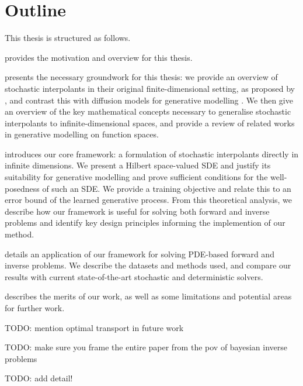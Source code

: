 \section{Outline}
This thesis is structured as follows.

\textbf{} provides the motivation and overview for this thesis.

\textbf{} presents the necessary groundwork for this thesis: we provide an overview of stochastic interpolants in their original finite-dimensional setting, as proposed by \citet{albergo2023stochasticinterpolantsunifyingframework}, and contrast this with diffusion models for generative modelling \citep{song2021scorebasedgenerativemodelingstochastic}. We then give an overview of the key mathematical concepts necessary to generalise stochastic interpolants to infinite-dimensional spaces, and provide a review of related works in generative modelling on function spaces.

\textbf{} introduces our core framework: a formulation of stochastic interpolants directly in infinite dimensions. We present a Hilbert space-valued SDE and justify its suitability for generative modelling and prove sufficient conditions for the well-posedness of such an SDE. We provide a training objective and relate this to an error bound of the learned generative process. From this theoretical analysis, we describe how our framework is useful for solving both forward and inverse problems and identify key design principles informing the implemention of our method.

\textbf{} details an application of our framework for solving PDE-based forward and inverse problems. We describe the datasets and methods used, and compare our results with current state-of-the-art stochastic and deterministic solvers. %

\textbf{} describes the merits of our work, as well as some limitations and potential areas for further work.

TODO: mention optimal transport in future work

TODO: make sure you frame the entire paper from the pov of bayesian inverse problems

TODO: add detail!




